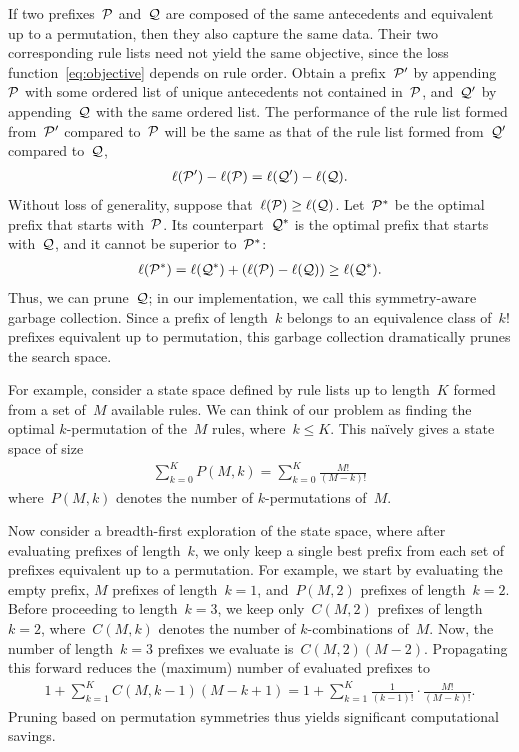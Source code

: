 If two prefixes~$\cal{P}$ and~$\cal{Q}$ are composed of the same antecedents and
equivalent up to a permutation, then they also capture the same data.
%
Their two corresponding rule lists need not yield the same objective, since the
loss function~\eqref{eq:objective} depends on rule order.
%
Obtain a prefix~$\cal{P}'$ by appending~$\cal{P}$ with some ordered list of
unique antecedents not contained in~$\cal{P}$, and~$\cal{Q}'$ by appending~$\cal{Q}$
with the same ordered list.
%
The performance of the rule list formed from~$\cal{P}'$ compared to~$\cal{P}$ will be
the same as that of the rule list formed from~$\cal{Q}'$ compared to~$\cal{Q}$, \ie
\begin{align}
\ell(\cal{P}') - \ell(\cal{P}) = \ell(\cal{Q}') - \ell(\cal{Q}).
\end{align}
Without loss of generality, suppose that~${\ell(\cal{P}) \ge \ell(\cal{Q})}$.
%
Let~$\cal{P}^*$ be the optimal prefix that starts with~$\cal{P}$.
%
Its counterpart~$\cal{Q}^*$ is the optimal prefix that starts with~$\cal{Q}$,
and it cannot be superior to~$\cal{P^*}$:
%
\begin{align}
\ell(\cal{P}^*) = \ell(\cal{Q^*}) + (\ell(\cal{P}) - \ell(\cal{Q})) \ge \ell(\cal{Q^*}).
\end{align}
%
Thus, we can prune~$\cal{Q}$;
in our implementation, we call this symmetry-aware garbage collection.
%
Since a prefix of length~$k$ belongs to an equivalence class of~$k!$ prefixes
equivalent up to permutation, this garbage collection dramatically prunes the search space.

For example, consider a state space defined by rule lists up to length~$K$
formed from a set of~$M$ available rules.
%
We can think of our problem as finding the optimal $k$-permutation of the~$M$ rules,
where~${k \le K}$.
%
This na\"ively gives a state space of size
\begin{align}
\sum_{k=0}^K P(M, k) = \sum_{k=0}^K \frac{M!}{(M - k)!}
\end{align}
where~${P(M, k)}$ denotes the number of $k$-permutations of~$M$.

Now consider a breadth-first exploration of the state space,
where after evaluating prefixes of length~$k$, we only keep a single best prefix
from each set of prefixes equivalent up to a permutation.
%
For example, we start by evaluating the empty prefix,
$M$ prefixes of length~${k=1}$, and~${P(M, 2)}$ prefixes of length~${k=2}$.
%
Before proceeding to length~${k=3}$, we keep only~${C(M, 2)}$ prefixes of length~${k=2}$,
where~${C(M, k)}$ denotes the number of $k$-combinations of~$M$.
%
Now, the number of length~${k=3}$ prefixes we evaluate is~${C(M, 2) (M - 2)}$.
%
Propagating this forward reduces the (maximum) number of evaluated prefixes to
\begin{align}
1 + \sum_{k=1}^K C(M, k-1) (M - k + 1)
= 1 + \sum_{k=1}^K \frac{1}{(k - 1)!} \cdot \frac{M!}{(M - k)!}.
\end{align}
Pruning based on permutation symmetries thus yields significant computational savings.

